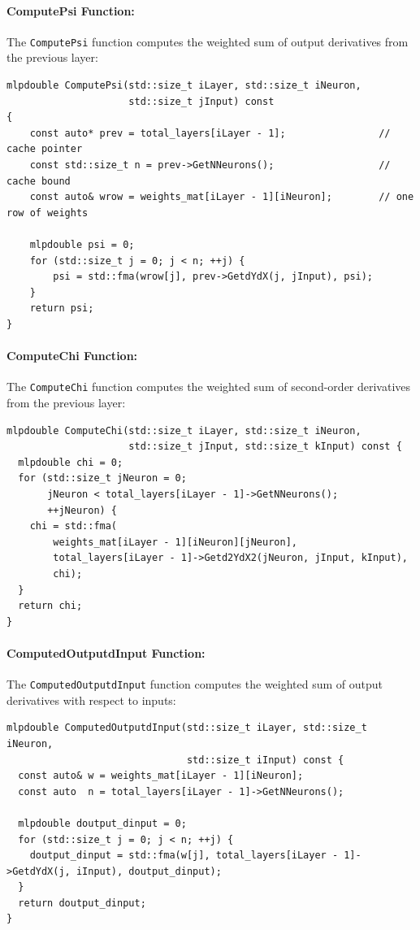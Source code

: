 \documentclass{article}
\begin{document}
\paragraph{ComputePsi Function:}
The \texttt{ComputePsi} function computes the weighted sum of output derivatives from the previous layer:

\begin{verbatim}
mlpdouble ComputePsi(std::size_t iLayer, std::size_t iNeuron,
                     std::size_t jInput) const
{
    const auto* prev = total_layers[iLayer - 1];                // cache pointer
    const std::size_t n = prev->GetNNeurons();                  // cache bound
    const auto& wrow = weights_mat[iLayer - 1][iNeuron];        // one row of weights

    mlpdouble psi = 0;
    for (std::size_t j = 0; j < n; ++j) {
        psi = std::fma(wrow[j], prev->GetdYdX(j, jInput), psi);
    }
    return psi;
}
\end{verbatim}

\paragraph{ComputeChi Function:}
The \texttt{ComputeChi} function computes the weighted sum of second-order derivatives from the previous layer:

\begin{verbatim}
mlpdouble ComputeChi(std::size_t iLayer, std::size_t iNeuron,
                     std::size_t jInput, std::size_t kInput) const {
  mlpdouble chi = 0;
  for (std::size_t jNeuron = 0;
       jNeuron < total_layers[iLayer - 1]->GetNNeurons();
       ++jNeuron) {
    chi = std::fma(
        weights_mat[iLayer - 1][iNeuron][jNeuron],
        total_layers[iLayer - 1]->Getd2YdX2(jNeuron, jInput, kInput),
        chi);
  }
  return chi;
}
\end{verbatim}

\paragraph{ComputedOutputdInput Function:}
The \texttt{ComputedOutputdInput} function computes the weighted sum of output derivatives with respect to inputs:

\begin{verbatim}
mlpdouble ComputedOutputdInput(std::size_t iLayer, std::size_t iNeuron,
                               std::size_t iInput) const {
  const auto& w = weights_mat[iLayer - 1][iNeuron];
  const auto  n = total_layers[iLayer - 1]->GetNNeurons();
  
  mlpdouble doutput_dinput = 0;
  for (std::size_t j = 0; j < n; ++j) {
    doutput_dinput = std::fma(w[j], total_layers[iLayer - 1]->GetdYdX(j, iInput), doutput_dinput);
  }
  return doutput_dinput;
}
\end{verbatim}
\end{document}
